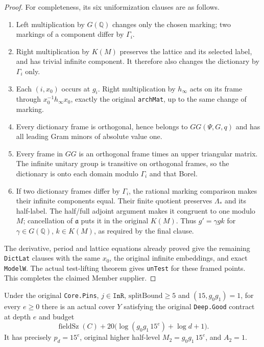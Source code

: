 \begin{proof}
For completeness, its six uniformization clauses are as follows.
\begin{enumerate}
\item Left multiplication by $G(\mathbb Q)$ changes only the
chosen marking; two markings of a component differ by
$\Gamma_i$.
\item Right multiplication by $K(M)$ preserves the lattice and
its selected label, and has trivial infinite component.
It therefore also changes the dictionary by $\Gamma_i$ only.
\item Each $(i,x_0)$ occurs at $g_i$.  Right multiplication by
$h_\infty$ acts on its frame through
$x_0^{-1}h_\infty x_0$, exactly the original \texttt{archMat},
up to the same change of marking.
\item Every dictionary frame is orthogonal, hence belongs to
$GG(\Psi,G,q)$ and has all leading Gram minors of absolute
value one.
\item Every frame in $GG$ is an orthogonal frame times an
upper triangular matrix.  The infinite unitary group is
transitive on orthogonal frames, so the dictionary is onto
each domain modulo $\Gamma_i$ and that Borel.
\item If two dictionary frames differ by $\Gamma_i$, the
rational marking comparison makes their infinite components
equal.  Their finite quotient preserves $\Lambda_*$ and its
half-label.  The half/full adjoint argument makes it
congruent to one modulo $M$; cancellation of $\mathfrak a$
puts it in the original $K(M)$.  Thus
$g'=\gamma gk$ for $\gamma\in G(\mathbb Q)$, $k\in K(M)$,
as required by the final clause.
\end{enumerate}
The derivative, period and lattice equations already proved
give the remaining \texttt{DictLat} clauses with the same
$x_0$, the original infinite embeddings, and exact
\texttt{ModelW}.  The actual test-lifting theorem gives
\texttt{unTest} for these framed points.  This completes the
claimed Member supplier.
\end{proof}

\begin{corollary}\label{cor:actual-good-sized-cover}
Under the original \texttt{Core.Pins}, $j\in\texttt{InR}$,
$\mathrm{splitBound}\ge5$ and $(15,g_0g_1)=1$, for every $e\ge0$
there is an actual cover $Y$ satisfying the original
\texttt{Deep.Good} contract at depth $e$ and budget
\[
  \operatorname{fieldSz}(C)+
       20\bigl(\log(g_0g_1\,15^e)+\log d+1\bigr).
\]
It has precisely $p_d=15^e$, original higher half-level
$M_2=g_0g_1\,15^e$, and $A_2=1$.
\end{corollary}

